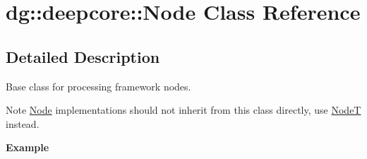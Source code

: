 \hypertarget{classdg_1_1deepcore_1_1_node}{}\section{dg\+:\+:deepcore\+:\+:Node Class Reference}
\label{classdg_1_1deepcore_1_1_node}


\subsection{Detailed Description}
Base class for processing framework nodes. 

\begin{DoxyNote}{Note}
\hyperlink{classdg_1_1deepcore_1_1_node}{Node} implementations should not inherit from this class directly, use \hyperlink{structdg_1_1deepcore_1_1_node_t}{NodeT} instead.
\end{DoxyNote}
{\bfseries Example} 
